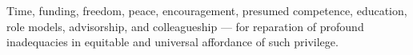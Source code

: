 Time, funding, freedom, peace, encouragement, presumed competence, education, role models, advisorship, and colleagueship --- for reparation of profound inadequacies in equitable and universal affordance of such privilege.
